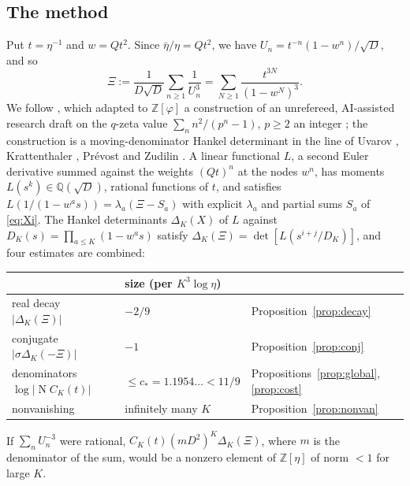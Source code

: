 \documentclass[11pt]{amsart}
\theoremstyle{definition}
\theoremstyle{remark}
\numberwithin{equation}{section}
\newcommand{\ZZ}{\mathbb{Z}}
\newcommand{\QQ}{\mathbb{Q}}
\newcommand{\Nm}{\operatorname{N}}
\begin{document}
\subsection*{The method}
Put $t=\eta^{-1}$ and $w=Qt^2$. Since $\bar\eta/\eta=Qt^2$, we have $U_n=t^{-n}(1-w^n)/\sqrt D$, and so
\begin{equation}\label{eq:Xi}
\Xi:=\frac1{D\sqrt D}\sum_{n\ge1}\frac1{U_n^3}=\sum_{N\ge1}\frac{t^{3N}}{(1-w^N)^3}.
\end{equation}
We follow \cite{Kri26}, which adapted to $\ZZ[\varphi]$ a construction of an unrefereed, AI-assisted research draft on the $q$-zeta
value $\sum_nn^2/(p^n-1)$, $p\ge2$ an integer \cite{UPL,QZ3}; the construction is a moving-denominator Hankel
determinant in the line of Uvarov \cite{Uva69}, Krattenthaler \cite{Kra21}, Pr\'evost \cite{Pre96} and Zudilin
\cite{Zud16,Zud17}. A linear functional $L$, a second Euler derivative summed against the weights $(Qt)^n$ at the nodes
$w^n$, has moments $L(s^k)\in\QQ(\sqrt D)$, rational functions of $t$, and satisfies $L(1/(1-w^as))=\lambda_a(\Xi-S_a)$
with explicit $\lambda_a$ and partial sums $S_a$ of \eqref{eq:Xi}. The Hankel determinants $\Delta_K(X)$ of $L$ against
$D_K(s)=\prod_{a\le K}(1-w^as)$ satisfy $\Delta_K(\Xi)=\det[L(s^{i+j}/D_K)]$, and four estimates are combined:
\begin{center}
\small
\begin{tabular}{lll}
\toprule
 & size (per $K^3\log\eta$) & \\
\midrule
real decay $|\Delta_K(\Xi)|$ & $-2/9$ & Proposition~\ref{prop:decay}\\
conjugate $|\sigma\Delta_K(-\Xi)|$ & $-1$ & Proposition~\ref{prop:conj}\\
denominators $\log|\Nm C_K(t)|$ & $\le c_*=1.1954\ldots<11/9$ & Propositions~\ref{prop:global}, \ref{prop:cost}\\
nonvanishing & infinitely many $K$ & Proposition~\ref{prop:nonvan}\\
\bottomrule
\end{tabular}
\end{center}
If $\sum_nU_n^{-3}$ were rational, $C_K(t)(mD^2)^K\Delta_K(\Xi)$, where $m$ is the denominator of the sum, would be a nonzero element of $\ZZ[\eta]$ of norm $<1$
for large $K$.
\end{document}
